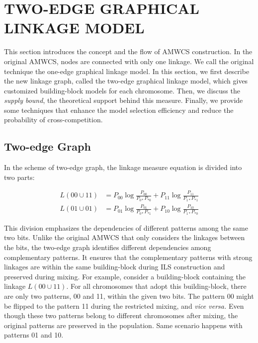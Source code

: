 \section{TWO-EDGE GRAPHICAL LINKAGE MODEL}
This section introduces the concept and the flow of AMWCS construction. In the original AMWCS, nodes are connected with only one linkage. We call the original technique the one-edge graphical linkage model. In this section, we first describe the new linkage graph, called the two-edge graphical linkage model, which gives customized building-block models for each chromosome. Then, we discuss the \textit{supply bound}, the theoretical support behind this measure. Finally, we provide some techniques that enhance the model selection efficiency and reduce the probability of cross-competition. 

\subsection{Two-edge Graph}
In the scheme of two-edge graph, the linkage measure equation is divided into two parts:

\begin{equation} 
\begin{split}
L( 00 \cup 11 ) &= P_{00 }\log{\frac{P_{00}}{P_{0*} P_{*0}}} + P_{11 }\log{\frac{P_{11}}{P_{1*} P_{*1}}}  \\
L( 01 \cup 01 ) &= P_{01 }\log{\frac{P_{01}}{P_{0*} P_{*1}}} + P_{10 }\log{\frac{P_{10}}{P_{1*} P_{*0}}}  
\end{split}
\end{equation}

This division emphasizes the dependencies of different patterns among the same two bits. Unlike the original AMWCS that only considers the linkages between the bits, the two-edge graph identifies different dependencies among complementary patterns. It ensures that the complementary patterns with strong linkages are within the same building-block during ILS construction and preserved during mixing. For example, consider a building-block containing the linkage $L(00\cup11)$. For all chromosomes that adopt this building-block, there are only two patterns, 00 and 11, within the given two bits. The pattern 00 might be flipped to the pattern 11 during the restricted mixing, and \textit{vice versa.} Even though these two patterns belong to different chromosomes after mixing, the original patterns are preserved in the population. Same scenario happens with patterns 01 and 10.


